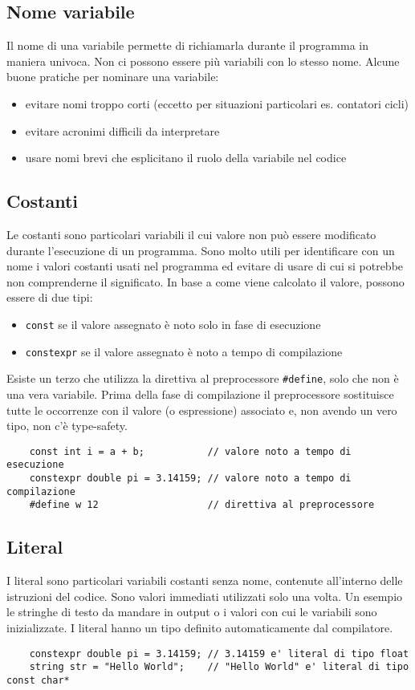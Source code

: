 \documentclass[a4paper]{article}
\begin{document}
\newpage

\subsection{Nome variabile}
Il nome di una variabile permette di richiamarla durante il programma in maniera univoca. Non ci possono essere più variabili con
lo stesso nome. Alcune buone pratiche per nominare una variabile:
\begin{itemize}
	\item evitare nomi troppo corti (eccetto per situazioni particolari es. contatori cicli)
	\item evitare acronimi difficili da interpretare
	\item usare nomi brevi che esplicitano il ruolo della variabile nel codice
\end{itemize}

\subsection{Costanti}
Le costanti sono particolari variabili il cui valore non può essere modificato durante l'esecuzione di un programma. Sono molto
utili per identificare con un nome i valori costanti usati nel programma ed evitare di usare  di cui si
potrebbe non comprenderne il significato. In base a come viene calcolato il valore, possono essere di due tipi:
\begin{itemize}
	\item \verb|const| se il valore assegnato è noto solo in fase di esecuzione
	\item \verb|constexpr| se il valore assegnato è noto a tempo di compilazione
\end{itemize}
Esiste un terzo  che utilizza la direttiva al preprocessore \verb|#define|, solo che non è una vera variabile. Prima
della fase di compilazione il preprocessore sostituisce tutte le occorrenze con il valore (o espressione) associato e, non avendo
un vero tipo, non c'è type-safety.
\begin{lstlisting}
	const int i = a + b;           // valore noto a tempo di esecuzione
	constexpr double pi = 3.14159; // valore noto a tempo di compilazione
	#define w 12                   // direttiva al preprocessore
\end{lstlisting}

\subsection{Literal}
I literal sono particolari variabili costanti senza nome, contenute all'interno delle istruzioni del codice. Sono valori
immediati utilizzati solo una volta. Un esempio le stringhe di testo da mandare in output o i valori con cui le variabili
sono inizializzate. I literal hanno un tipo definito automaticamente dal compilatore.
\begin{lstlisting}
	constexpr double pi = 3.14159; // 3.14159 e' literal di tipo float
	string str = "Hello World";    // "Hello World" e' literal di tipo const char*
\end{lstlisting}
\end{document}
